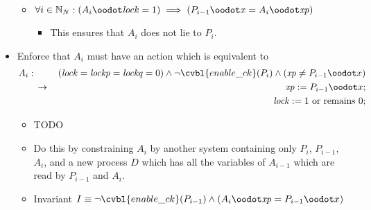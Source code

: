 \begin{itemize}
\begin{itemize}
\begin{itemize}
  \end{itemize}
 \item $\forall i\in\Nat_N: (A_i\oodot\vbl{lock}=1) \implies (P_{i-1}\oodot x = A_i\oodot\vbl{xp})$
  \begin{itemize}
  \item This ensures that $A_i$ does not lie to $P_i$.
  \end{itemize}
 \end{itemize}
 \item Enforce that $A_i$ must have an action which is equivalent to
 \begin{eqnarray*}
 A_i: & & (\vbl{lock} = \vbl{lockp} = \vbl{lockq} = 0) \wedge \neg \cvbl{enable\_ck}(P_i) \wedge (\vbl{xp} \ne P_{i-1}\oodot x)
 \\& \actxnto & \vbl{xp} \defeq P_{i-1}\oodot x;
 \\& & \vbl{lock} \defeq 1 \mbox{ or remains } 0;
 \end{eqnarray*}
  \begin{itemize}
  \item TODO
  \item Do this by constraining $A_i$ by another system containing only $P_i$, $P_{i-1}$, $A_i$, and a new process $D$ which has all the variables of $A_{i-1}$ which are read by $P_{i-1}$ and $A_i$.
  \item Invariant $I \equiv \neg \cvbl{enable\_ck}(P_{i-1}) \wedge (A_i\oodot\vbl{xp} = P_{i-1}\oodot x)$
  \end{itemize}
\end{itemize}



